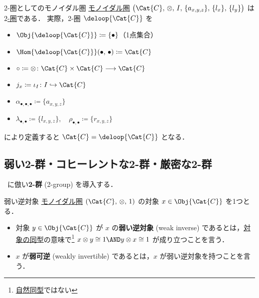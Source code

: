 \documentclass[TQFT_main]{subfiles}
\begin{document}
\begin{myexample}[label=ex:moncat2cat]{2-圏としてのモノイダル圏}
    \hyperref[redef:monoidal-category]{モノイダル圏} $\bigl(\Cat{C},\, \otimes,\, I,\, \{a_{x,y,z}\},\, \{l_x\},\, \{l_y\}\bigr)$ は\hyperref[def:2cat]{$2$-圏}である．
    実際，2-圏 $\deloop{\Cat{C}}$ を
    \begin{itemize}
        \item $\Obj{\deloop{\Cat{C}}} \coloneqq \{\bullet\}$（1点集合）
        \item $\Hom{\deloop{\Cat{C}}} (\bullet,\, \bullet) \coloneqq \Cat{C}$
        \item $\circ \coloneqq \otimes  \colon \Cat{C} \times \Cat{C} \lto \Cat{C}$
        \item $j_x \coloneqq \iota_I \colon I \hookrightarrow \Cat{C}$
        \item $\alpha_{\bullet,\bullet,\bullet} \coloneqq \{a_{x,y,z}\}$
        \item $\lambda_{\bullet,\bullet} \coloneqq \{l_{x,y,z}\},\quad \rho_{\bullet,\bullet} \coloneqq \{r_{x,y,z}\}$
    \end{itemize}
    により定義すると $\Cat{C} = \deloop{\Cat{C}}$ となる．
\end{myexample}


\subsection{弱い2-群・コヒーレントな2-群・厳密な2-群}

~\cite{baez2004higherdimensionalalgebrav2groups}に倣い\textbf{2-群} (2-group) を導入する．

\begin{mydef}[label=def:weak-inverse]{弱い逆対象}
    \hyperref[redef:monoidal-category]{モノイダル圏} $(\Cat{C},\, \otimes ,\, 1)$ の対象 $x \in \Obj{\Cat{C}}$ を1つとる．
    
    \begin{itemize}
        \item 対象 $y \in \Obj{\Cat{C}}$ が $x$ の\textbf{弱い逆対象} (weak inverse) であるとは，\hyperref[def:iso]{対象の同型}の意味で\footnote{\hyperref[nat]{自然同型}ではない} $x \otimes y \cong 1 \AND y \otimes x \cong 1$ が成り立つことを言う．
        \item $x$ が\textbf{弱可逆} (weakly invertible) であるとは，$x$ が弱い逆対象を持つことを言う．
    \end{itemize}
    
\end{mydef}
\end{document}
